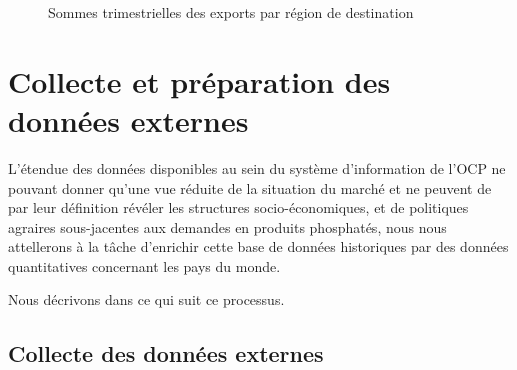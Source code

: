 				\begin{figure}[H]
				\centering
				\caption{Sommes trimestrielles des exports par région de destination}
				\label{fig:compReg}
				\end{figure}

	\section{Collecte et préparation des données externes}
	L'étendue des données disponibles au sein du système d'information de l'OCP ne pouvant donner qu'une vue réduite de la situation du marché et ne peuvent de par leur définition révéler les structures socio-économiques,  et de politiques agraires sous-jacentes aux demandes en produits phosphatés, nous nous attellerons à la tâche d'enrichir cette base de données historiques par des données quantitatives concernant les pays du monde.
	\par
	Nous décrivons dans ce qui suit ce processus. 
	\subsection{Collecte des données externes}
